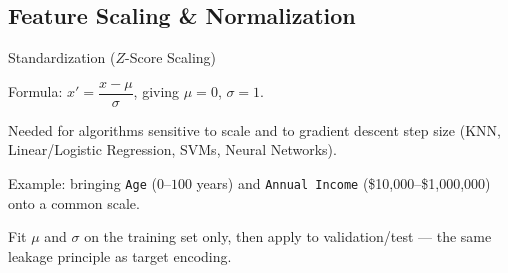 

\subsection{Feature Scaling \& Normalization}


\begin{frame}{Standardization ($Z$-Score Scaling)}
    \begin{sitemize}
        \item Formula: $x' = \dfrac{x - \mu}{\sigma}$, giving $\mu = 0$, $\sigma = 1$.
        \item Needed for algorithms sensitive to scale and to gradient descent step size (KNN, Linear/Logistic Regression, SVMs, Neural Networks).
        \item Example: bringing \texttt{Age} ($0$--$100$ years) and \texttt{Annual Income} (\$10,000--\$1,000,000) onto a common scale.
        \item Fit $\mu$ and $\sigma$ on the training set only, then apply to validation/test — the same leakage principle as target encoding.
    \end{sitemize}
\end{frame}


